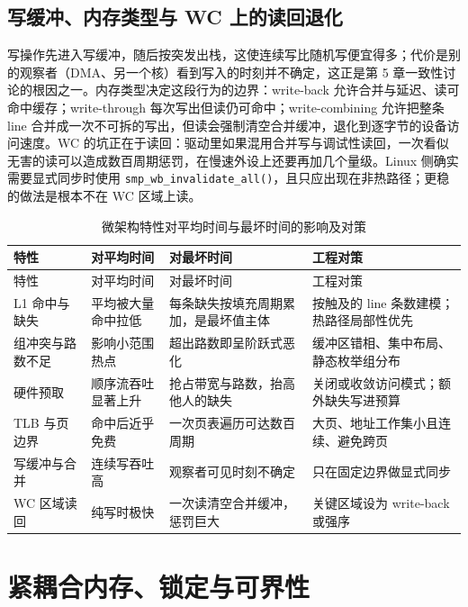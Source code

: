 \documentclass[12pt,a4paper,fontset=fandol]{ctexbook}
\newcommand{\Fn}[1]{\texttt{#1()}}
\begin{document}
\subsection{写缓冲、内存类型与 WC 上的读回退化}

写操作先进入写缓冲，随后按突发出栈，这使连续写比随机写便宜得多；代价是别的观察者（DMA、另一个核）看到写入的时刻并不确定，这正是第 5 章一致性讨论的根因之一。内存类型决定这段行为的边界：write-back 允许合并与延迟、读可命中缓存；write-through 每次写出但读仍可命中；write-combining 允许把整条 line 合并成一次不可拆的写出，但读会强制清空合并缓冲，退化到逐字节的设备访问速度。WC 的坑正在于读回：驱动里如果混用合并写与调试性读回，一次看似无害的读可以造成数百周期惩罚，在慢速外设上还要再加几个量级。Linux 侧确实需要显式同步时使用 \Fn{smp\_wb\_invalidate\_all}，且只应出现在非热路径；更稳的做法是根本不在 WC 区域上读。

\begin{longtable}{>{\raggedright\arraybackslash}p{}>{\raggedright\arraybackslash}p{}>{\raggedright\arraybackslash}p{}>{\raggedright\arraybackslash}p{}}
\caption{微架构特性对平均时间与最坏时间的影响及对策}\label{tab:ch13-microarch}\\
\toprule
特性 & 对平均时间 & 对最坏时间 & 工程对策 \\
\midrule
\endfirsthead
\toprule
特性 & 对平均时间 & 对最坏时间 & 工程对策 \\
\midrule
\endhead
\bottomrule
\endfoot
\endlastfoot
L1 命中与缺失 & 平均被大量命中拉低 & 每条缺失按填充周期累加，是最坏值主体 & 按触及的 line 条数建模；热路径局部性优先 \\
组冲突与路数不足 & 影响小范围热点 & 超出路数即呈阶跃式恶化 & 缓冲区错相、集中布局、静态枚举组分布 \\
硬件预取 & 顺序流吞吐显著上升 & 抢占带宽与路数，抬高他人的缺失 & 关闭或收敛访问模式；额外缺失写进预算 \\
TLB 与页边界 & 命中后近乎免费 & 一次页表遍历可达数百周期 & 大页、地址工作集小且连续、避免跨页 \\
写缓冲与合并 & 连续写吞吐高 & 观察者可见时刻不确定 & 只在固定边界做显式同步 \\
WC 区域读回 & 纯写时极快 & 一次读清空合并缓冲，惩罚巨大 & 关键区域设为 write-back 或强序 \\
\end{longtable}

\section{紧耦合内存、锁定与可界性}
\label{sec:ch13-tcm}
\end{document}
